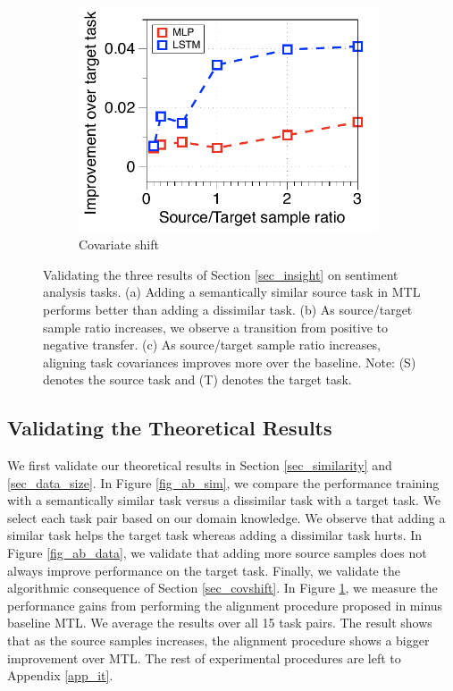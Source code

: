 \begin{figure}[!t]
\begin{subfigure}[b]{0.33\textwidth}
		\includegraphics[width=0.975\textwidth]{figures/ratio_alignment_norm_diff_all.pdf}
		\caption{Covariate shift}
		\label{fig_ab_cov}
	\end{subfigure}
	\caption{Validating the three results of Section \ref{sec_insight} on sentiment analysis tasks. (a) Adding a semantically similar source task in MTL performs better than adding a dissimilar task.
	(b) As source/target sample ratio increases, we observe a transition from positive to negative transfer.
	(c) As source/target sample ratio increases, aligning task covariances \cite{WZR20} improves more over the baseline.
	Note: (S) denotes the source task and (T) denotes the target task.}
	\label{fig_ablation}
	\vspace{-0.15in}
\end{figure}

\vspace{-0.07in}
\subsection{Validating the Theoretical Results}\label{sec_exp_ab}

We first validate our theoretical results in Section \ref{sec_similarity} and \ref{sec_data_size}.
In Figure \ref{fig_ab_sim}, we compare the performance training with a semantically similar task versus a dissimilar task with a target task.
We select each task pair based on our domain knowledge.
We observe that adding a similar task helps the target task whereas adding a dissimilar task hurts.
In Figure \ref{fig_ab_data}, we validate that adding more source samples does not always improve performance on the target task.
Finally, we validate the algorithmic consequence of Section \ref{sec_covshift}.
In Figure \ref{fig_ab_cov}, we measure the performance gains from performing the alignment procedure proposed in \cite{WZR20} minus baseline MTL.
We average the results over all 15 task pairs.
The result shows that as the source samples increases, the alignment procedure shows a bigger improvement over MTL.
The rest of experimental procedures are left to Appendix \ref{app_it}.


